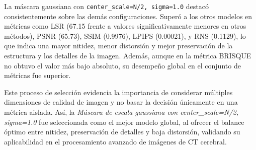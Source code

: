 La máscara gaussiana con \texttt{center\_scale=N/2, sigma=1.0} destacó consistentemente sobre las demás configuraciones. Superó a los otros modelos en métricas como LSR (67.15 frente a valores significativamente menores en otros métodos), PSNR (65.73), SSIM (0.9976), LPIPS (0.00021), y RNS (0.1129), lo que indica una mayor nitidez, menor distorsión y mejor preservación de la estructura y los detalles de la imagen. Además, aunque en la métrica BRISQUE no obtuvo el valor más bajo absoluto, su desempeño global en el conjunto de métricas fue superior.

Este proceso de selección evidencia la importancia de considerar múltiples dimensiones de calidad de imagen y no basar la decisión únicamente en una métrica aislada. Así, la \textit{Máscara de escala gaussiana con center\_scale=N/2, sigma=1.0} fue seleccionada como el mejor modelo global, al ofrecer el balance óptimo entre nitidez, preservación de detalles y baja distorsión, validando su aplicabilidad en el procesamiento avanzado de imágenes de CT cerebral.

\begin{table}[H]
\centering
\caption{Comparativa de métricas para los mejores modelos de cada categoría.}
\label{tab:comparativa_final}
\end{table}

